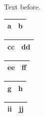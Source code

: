 \documentclass{article}
\newcommand{\tight}{\setlength{\tabcolsep}{0pt}}
\newcommand{\widen}[1]{\addtolength{\tabcolsep}{#1}}
\newcommand{\heavy}{\setlength\arrayrulewidth{2pt}\tight}
\newcommand{\scoped}{{\setlength{\tabcolsep}{20pt}}}
\begin{document}
Text before.

{\tight
\begin{tabular}{|l|r|}\hline a & b\\\hline\end{tabular}}

\begin{tabular}{|l|r|}\hline cc & dd\\\hline\end{tabular}

{\widen{4pt}\begin{tabular}{|l|r|}\hline ee & ff\\\hline\end{tabular}}

{\heavy\begin{tabular}{|l|r|}\hline g & h\\\hline\end{tabular}}

\scoped\begin{tabular}{|l|r|}\hline ii & jj\\\hline\end{tabular}
\end{document}
